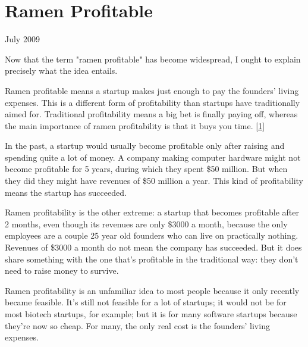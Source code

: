 \chapter{Ramen Profitable}


            
              
                


                  
                    July 2009

Now that the term "ramen profitable"
                    has become widespread, I ought to explain precisely what the
                    idea entails.

Ramen profitable means a startup
                    makes just enough to pay the founders' living expenses. This
                    is a different form of profitability than startups have
                    traditionally aimed for. Traditional profitability means a
                    big bet is finally paying off, whereas the main importance
                    of ramen profitability is that it buys you time.
                    [\href{\#f1n}{1}]

In the past, a startup would usually become
                    profitable only after raising and spending quite a lot of
                    money. A company making computer hardware might not become
                    profitable for 5 years, during which they spent \$50 million.
                    But when they did they might have revenues of \$50 million a
                    year. This kind of profitability means the startup has
                    succeeded.

Ramen profitability is the other
                    extreme: a startup that becomes profitable after 2 months,
                    even though its revenues are only \$3000 a month, because the
                    only employees are a couple 25 year old founders who can
                    live on practically nothing. Revenues of \$3000 a month do
                    not mean the company has succeeded. But it does share
                    something with the one that's profitable in the traditional
                    way: they don't need to raise money to survive.

Ramen
                    profitability is an unfamiliar idea to most people because
                    it only recently became feasible. It's still not feasible
                    for a lot of startups; it would not be for most biotech
                    startups, for example; but it is for many software startups
                    because they're now so cheap. For many, the only real cost
                    is the founders' living expenses.

